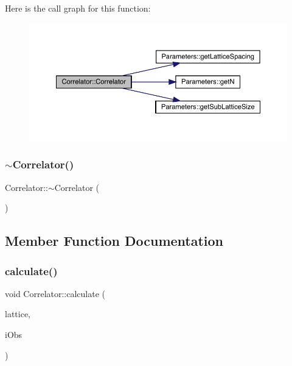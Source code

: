Here is the call graph for this function\+:\nopagebreak
\begin{figure}[H]
\begin{center}
\leavevmode
\includegraphics[width=350pt]{class_correlator_a6114955836dba0b4b61138490cd3fe91_cgraph}
\end{center}
\end{figure}
\mbox{\label{class_correlator_a48307431ca91b41319c6b68c6684634d}} 
\subsubsection{\texorpdfstring{$\sim$Correlator()}{~Correlator()}}
{\footnotesize\ttfamily Correlator\+::$\sim$\+Correlator (\begin{DoxyParamCaption}{ }\end{DoxyParamCaption})\hspace{0.3cm}{\ttfamily [virtual]}}



\subsection{Member Function Documentation}
\mbox{\label{class_correlator_ab33502ff305f891c5c2e6d66a26a0247}} 
\subsubsection{\texorpdfstring{calculate()}{calculate()}}
{\footnotesize\ttfamily void Correlator\+::calculate (\begin{DoxyParamCaption}\item[{\mbox{\hyperlink{class_lattice}{Lattice}}$<$ \mbox{\hyperlink{class_s_u3}{S\+U3}} $>$ $\ast$}]{lattice,  }\item[{unsigned int}]{i\+Obs }\end{DoxyParamCaption})\hspace{0.3cm}{\ttfamily [virtual]}}



